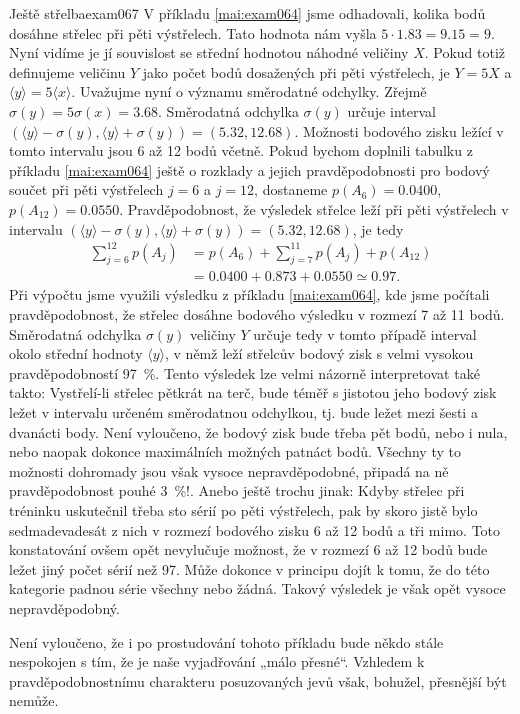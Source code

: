 \begin{mathexam}{Ještě střelba}{exam067}
  V příkladu \ref{mai:exam064} jsme odhadovali, kolika bodů dosáhne střelec při pěti výstřelech.
  Tato hodnota nám vyšla \(\num{5}\cdot\num{1.83} = \num{9.15} = 9\). Nyní vidíme je jí souvislost
  se střední hodnotou náhodné veličiny \(X\). Pokud totiž definujeme veličinu \(Y\) jako počet bodů
  dosažených při pěti výstřelech, je \(Y = 5X\) a \(\langle y \rangle = 5\langle x \rangle\).
  Uvažujme nyní o významu směrodatné odchylky. Zřejmě \(\sigma(y) = 5\sigma(x) = \num{3.68}\).
  Směrodatná odchylka \(\sigma(y)\) určuje interval \((\langle y \rangle - \sigma(y), \langle y
  \rangle + \sigma(y)) = (\num{5.32}, \num{12.68})\). Možnosti bodového zisku ležící v tomto
  intervalu jsou \num{6} až \num{12} bodů včetně. Pokud bychom doplnili tabulku z příkladu
  \ref{mai:exam064} ještě o rozklady a jejich pravděpodobnosti pro bodový součet při pěti výstřelech
  \(j = \num{6}\) a \(j = \num{12}\), dostaneme \(p(A_6) = \num{0.0400}\), \(p(A_{12}) =
  \num{0.0550}\). Pravděpodobnost, že výsledek střelce leží při pěti výstřelech v intervalu
  \((\langle y \rangle - \sigma(y), \langle y \rangle + \sigma(y)) = (\num{5.32}, \num{12.68})\), je
  tedy
  \begin{align*}
    \sum_{j=6}^{12}p(A_j) &= p(A_6) + \sum_{j=7}^{11}p(A_j) + p(A_{12})                \\
                          &= \num{0.0400} + \num{0.873} + \num{0.0550} \simeq \num{0.97}.
  \end{align*}
  Při výpočtu jsme využili výsledku z příkladu \ref{mai:exam064}, kde jsme počítali pravděpodobnost,
  že střelec dosáhne bodového výsledku v rozmezí \num{7} až \num{11} bodů. Směrodatná odchylka
  \(\sigma(y)\) veličiny \(Y\) určuje tedy v tomto případě interval okolo střední hodnoty \(\langle
  y \rangle\), v němž leží střelcův bodový zisk s velmi vysokou pravděpodobností \qty{97}{\percent}.
  Tento výsledek lze velmi názorně interpretovat také takto: Vystřelí-li střelec pětkrát na terč,
  bude téměř s jistotou jeho bodový zisk ležet v intervalu určeném směrodatnou odchylkou, tj. bude
  ležet mezi šesti a dvanácti body. Není vyloučeno, že bodový zisk bude třeba pět bodů, nebo i nula,
  nebo naopak dokonce maximálních možných patnáct bodů. Všechny ty to možnosti dohromady jsou však
  vysoce nepravděpodobné, připadá na ně pravděpodobnost pouhé \qty{3}{\percent}!. Anebo ještě trochu
  jinak: Kdyby střelec při tréninku uskutečnil třeba sto sérií po pěti výstřelech, pak by skoro
  jistě bylo sedmadevadesát z nich v rozmezí bodového zisku \num{6} až \num{12} bodů a tři mimo.
  Toto konstatování ovšem opět nevylučuje možnost, že v rozmezí \num{6} až \num{12} bodů bude ležet
  jiný počet sérií než \num{97}. Může dokonce v principu dojít k tomu, že do této kategorie padnou
  série všechny nebo žádná. Takový výsledek je však opět vysoce nepravděpodobný.
  
  Není vyloučeno, že i po prostudování tohoto příkladu bude někdo stále nespokojen s tím, že je naše
  vyjadřování „málo přesné“. Vzhledem k pravděpodobnostnímu charakteru posuzovaných jevů však,
  bohužel, přesnější být nemůže.
\end{mathexam}